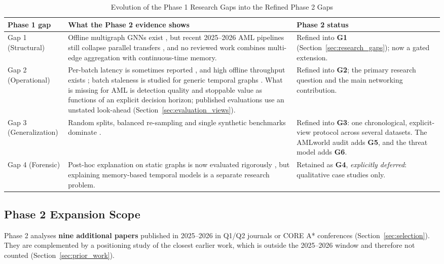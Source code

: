 \documentclass[11pt,a4paper]{article}
\begin{document}
\begin{table}[htbp]
\centering
\small
\caption{Evolution of the Phase 1 Research Gaps into the Refined Phase 2 Gaps}
\label{tab:gap_evolution}
\begin{tabularx}{\textwidth}{L{2.9cm} X L{3.0cm}}
\toprule
\textbf{Phase 1 gap} & \textbf{What the Phase 2 evidence shows} & \textbf{Phase 2 status} \\
\midrule
Gap 1 (Structural) & Offline multigraph GNNs exist \cite{egressy2024multigraph,ding2024diam,bilgi2026mega}, but recent 2025--2026 AML pipelines still collapse parallel transfers \cite{tian2025kar,alemari2026explainable,rico2026taml}, and no reviewed work combines multi-edge aggregation with continuous-time memory. & Refined into \textbf{G1} (Section~\ref{sec:research_gaps}); now a gated extension. \\
\midrule
Gap 2 (Operational) & Per-batch latency is sometimes reported \cite{lin2026chronowave,kasula2025ajk}, and high offline throughput exists \cite{egressy2024multigraph}; batch staleness is studied for generic temporal graphs \cite{su2024pres,anchorrm2026,streamtgn2026}. What is missing for AML is detection quality and stoppable value as functions of an explicit decision horizon; published evaluations use an unstated look-ahead (Section~\ref{sec:evaluation_views}). & Refined into \textbf{G2}; the primary research question and the main networking contribution. \\
\midrule
Gap 3 (Generalization) & Random splits, balanced re-sampling and single synthetic benchmarks dominate \cite{jia2025lmae4eth,kasula2025ajk,tian2025kar,rico2026taml}. & Refined into \textbf{G3}: one chronological, explicit-view protocol across several datasets. The AMLworld audit adds \textbf{G5}, and the threat model adds \textbf{G6}. \\
\midrule
Gap 4 (Forensic) & Post-hoc explanation on static graphs is now evaluated rigorously \cite{alemari2026explainable}, but explaining memory-based temporal models is a separate research problem. & Retained as \textbf{G4}, \emph{explicitly deferred}: qualitative case studies only. \\
\bottomrule
\end{tabularx}
\end{table}

\subsection{Phase 2 Expansion Scope}
Phase 2 analyses \textbf{nine additional papers} published in 2025--2026 in Q1/Q2 journals or CORE A* conferences (Section~\ref{sec:selection}). They are complemented by a positioning study of the closest earlier work, which is outside the 2025--2026 window and therefore not counted (Section~\ref{sec:prior_work}).
\end{document}
